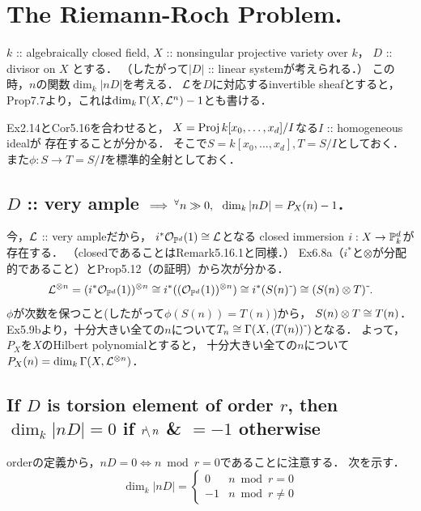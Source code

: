 \documentclass[a4paper]{jsarticle}
\begin{document}
\section{The Riemann-Roch Problem.} %
    $k$ :: algebraically closed field,
    $X$ :: nonsingular projective variety over $k$，
    $D$ :: divisor on $X$
    とする．
    （したがって$|D|$ :: linear systemが考えられる．）
    この時，$n$の関数$\dim_k |nD|$を考える．
    $\mathcal{L}$を$D$に対応するinvertible sheafとすると，
    Prop7.7より，これは$\dim_k \Gamma(X, \mathcal{L}^n)-1$とも書ける．

    Ex2.14とCor5.16を合わせると，
    $X=\operatorname{Proj} k[x_0, \dots, x_d]/I$なる$I$ :: homogeneous idealが
    存在することが分かる．
    そこで$S=k[x_0, \dots, x_d], T=S/I$としておく．
    また$\phi: S \to T=S/I$を標準的全射としておく．

    \subsection{$D$ :: very ample $\implies {}^{\forall} n \gg 0,~~ \dim_k |nD|=P_X(n)-1$.}
    今，$\mathcal{L}$ :: very ampleだから，
    $i^* \mathcal{O}_{\mathbb{P}^d}(1) \cong \mathcal{L}$となる
    closed immersion $i: X \to \mathbb{P}^d_k$が存在する．
    （closedであることはRemark5.16.1と同様．）
    Ex6.8a（$i^*$と$\otimes$が分配的であること）とProp5.12（の証明）から次が分かる．
    \[
        \mathcal{L}^{\otimes n}
        =(i^* \mathcal{O}_{\mathbb{P}^d}(1))^{\otimes n}
        \cong i^* ((\mathcal{O}_{\mathbb{P}^d}(1))^{\otimes n})
        \cong i^* (S(n) \,\tilde{}\,)
        \cong (S(n) \otimes T)\,\tilde{}\,.
    \]
    $\phi$が次数を保つこと(したがって$\phi(S(n))=T(n)$)から，
    $S(n) \otimes T \cong T(n)$．
    Ex5.9bより，十分大きい全ての$n$について$T_n \cong \Gamma(X, (T(n))\,\tilde{}\,)$となる．
    よって，
    $P_X$を$X$のHilbert polynomialとすると，
    十分大きい全ての$n$について$P_X(n)=\dim_k \Gamma(X, \mathcal{L}^{\otimes n})$．

    \subsection{If $D$ is torsion element of order $r$,
        then $\dim_k |nD|=0$ if $r \!\backslash\, n$ \& $=-1$ otherwise}

    orderの定義から，$nD=0 \iff n \bmod r=0$であることに注意する．
    次を示す．
    \[
        \dim_k |nD|=
        \begin{cases}{}
            0   & n \bmod r=0 \\
            -1  & n \bmod r \neq 0
        \end{cases}
    \]
\end{document}
